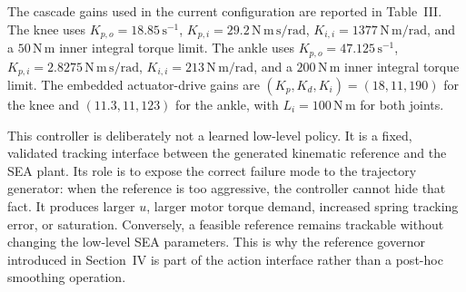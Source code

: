 The cascade gains used in the current configuration are reported in Table~III.
The knee uses \(K_{p,o}=18.85\,\mathrm{s^{-1}}\),
\(K_{p,i}=29.2\,\mathrm{N\,m\,s/rad}\),
\(K_{i,i}=1377\,\mathrm{N\,m/rad}\), and a \(50\,\mathrm{N\,m}\) inner
integral torque limit. The ankle uses
\(K_{p,o}=47.125\,\mathrm{s^{-1}}\),
\(K_{p,i}=2.8275\,\mathrm{N\,m\,s/rad}\),
\(K_{i,i}=213\,\mathrm{N\,m/rad}\), and a \(200\,\mathrm{N\,m}\) inner
integral torque limit. The embedded actuator-drive gains are
\((K_p,K_d,K_i)=(18,11,190)\) for the knee and \((11.3,11,123)\) for the
ankle, with \(L_i=100\,\mathrm{N\,m}\) for both joints.

This controller is deliberately not a learned low-level policy. It is a fixed,
validated tracking interface between the generated kinematic reference and the
SEA plant. Its role is to expose the correct failure mode to the trajectory
generator: when the reference is too aggressive, the controller cannot hide that
fact. It produces larger \(u\), larger motor torque demand, increased spring
tracking error, or saturation. Conversely, a feasible reference remains
trackable without changing the low-level SEA parameters. This is why the
reference governor introduced in Section~IV is part of the action interface
rather than a post-hoc smoothing operation.



